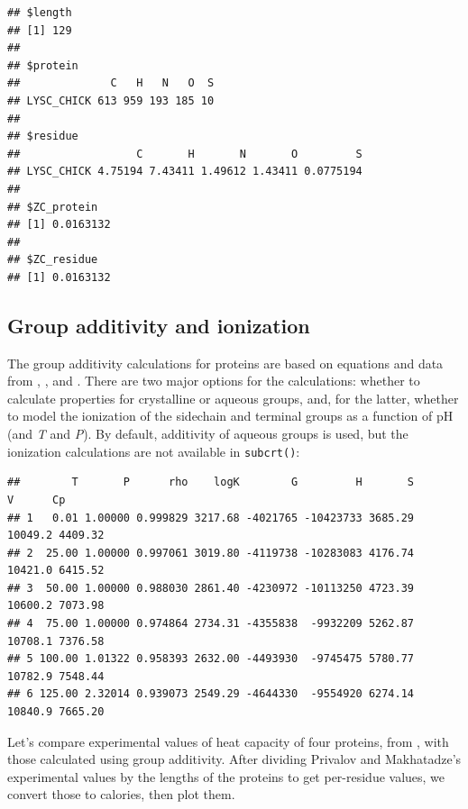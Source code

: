 \documentclass[]{tufte-handout}
\newenvironment{Shaded}{}{}
\newcommand{\KeywordTok}[1]{\textcolor[rgb]{0.00,0.44,0.13}{\textbf{#1}}}
\newcommand{\DecValTok}[1]{\textcolor[rgb]{0.25,0.63,0.44}{#1}}
\newcommand{\StringTok}[1]{\textcolor[rgb]{0.25,0.44,0.63}{#1}}
\newcommand{\OperatorTok}[1]{\textcolor[rgb]{0.40,0.40,0.40}{#1}}
\newcommand{\NormalTok}[1]{#1}
\begin{document}
\begin{verbatim}
## $length
## [1] 129
## 
## $protein
##              C   H   N   O  S
## LYSC_CHICK 613 959 193 185 10
## 
## $residue
##                  C       H       N       O         S
## LYSC_CHICK 4.75194 7.43411 1.49612 1.43411 0.0775194
## 
## $ZC_protein
## [1] 0.0163132
## 
## $ZC_residue
## [1] 0.0163132
\end{verbatim}

\subsection{Group additivity and
ionization}\label{group-additivity-and-ionization}

The group additivity calculations for proteins are based on equations
and data from \citet{AH00}, \citet{DLH06}, and \citet{LD12}. There are
two major options for the calculations: whether to calculate properties
for crystalline or aqueous groups, and, for the latter, whether to model
the ionization of the sidechain and terminal groups as a function of pH
(and \emph{T} and \emph{P}). By default, additivity of aqueous groups is
used, but the ionization calculations are not available in
\texttt{subcrt()}:

\begin{Shaded}
\end{Shaded}

\begin{verbatim}
##        T       P      rho    logK        G         H       S       V      Cp
## 1   0.01 1.00000 0.999829 3217.68 -4021765 -10423733 3685.29 10049.2 4409.32
## 2  25.00 1.00000 0.997061 3019.80 -4119738 -10283083 4176.74 10421.0 6415.52
## 3  50.00 1.00000 0.988030 2861.40 -4230972 -10113250 4723.39 10600.2 7073.98
## 4  75.00 1.00000 0.974864 2734.31 -4355838  -9932209 5262.87 10708.1 7376.58
## 5 100.00 1.01322 0.958393 2632.00 -4493930  -9745475 5780.77 10782.9 7548.44
## 6 125.00 2.32014 0.939073 2549.29 -4644330  -9554920 6274.14 10840.9 7665.20
\end{verbatim}

Let's compare experimental values of heat capacity of four proteins,
from \citet{PM90}, with those calculated using group additivity. After
dividing Privalov and Makhatadze's experimental values by the lengths of
the proteins to get per-residue values, we convert those to calories,
then plot them.
\end{document}
